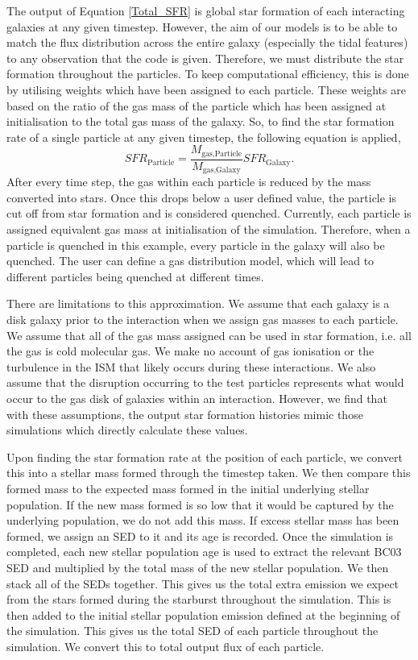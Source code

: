 The output of Equation \ref{Total_SFR} is global star formation of each interacting galaxies at any given timestep. However, the aim of our models is to be able to match the flux distribution across the entire galaxy (especially the tidal features) to any observation that the code is given. Therefore, we must distribute the star formation throughout the particles. To keep computational efficiency, this is done by utilising weights which have been assigned to each particle. These weights are based on the ratio of the gas mass of the particle which has been assigned at initialisation to the total gas mass of the galaxy. So, to find the star formation rate of a single particle at any given timestep, the following equation is applied,
\begin{equation}
    SFR_{\text{Particle}} = \frac{M_{\text{gas,Particle}}}{M_{\text{gas,Galaxy}}}SFR_{\text{Galaxy}}.
\end{equation}
After every time step, the gas within each particle is reduced by the mass converted into stars. Once this drops below a user defined value, the particle is cut off from star formation and is considered quenched. Currently, each particle is assigned equivalent gas mass at initialisation of the simulation. Therefore, when a particle is quenched in this example, every particle in the galaxy will also be quenched. The user can define a gas distribution model, which will lead to different particles being quenched at different times.

There are limitations to this approximation. We assume that each galaxy is a disk galaxy prior to the interaction when we assign gas masses to each particle. We assume that all of the gas mass assigned can be used in star formation, i.e. all the gas is cold molecular gas. We make no account of gas ionisation or the turbulence in the ISM that likely occurs during these interactions. We also assume that the disruption occurring to the test particles represents what would occur to the gas disk of galaxies within an interaction. However, we find that with these assumptions, the output star formation histories mimic those simulations which directly calculate these values. 

Upon finding the star formation rate at the position of each particle, we convert this into a stellar mass formed through the timestep taken. We then compare this formed mass to the expected mass formed in the initial underlying stellar population. If the new mass formed is so low that it would be captured by the underlying population, we do not add this mass. If excess stellar mass has been formed, we assign an SED to it and its age is recorded. Once the simulation is completed, each new stellar population age is used to extract the relevant BC03 SED and multiplied by the total mass of the new stellar population. We then stack all of the SEDs together. This gives us the total extra emission we expect from the stars formed during the starburst throughout the simulation. This is then added to the initial stellar population emission defined at the beginning of the simulation. This gives us the total SED of each particle throughout the simulation. We convert this to total output flux of each particle.

